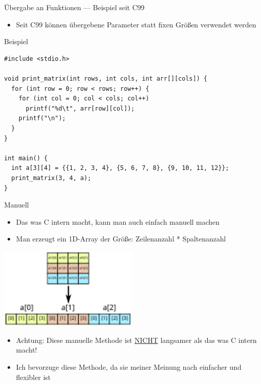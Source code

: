 \documentclass[presentation]{beamer}
\begin{document}
\begin{frame}[label={sec:orgc61af48},fragile]{Übergabe an Funktionen --- Beispiel seit C99}
 \begin{itemize}
\item Seit C99 können übergebene Parameter statt fixen Größen verwendet
werden
\end{itemize}
\begin{block}{Beispiel}
\begin{verbatim}
#include <stdio.h>

void print_matrix(int rows, int cols, int arr[][cols]) {
  for (int row = 0; row < rows; row++) {
    for (int col = 0; col < cols; col++)
      printf("%d\t", arr[row][col]);
    printf("\n");
  }
}

int main() {
  int a[3][4] = {{1, 2, 3, 4}, {5, 6, 7, 8}, {9, 10, 11, 12}};
  print_matrix(3, 4, a);
}
\end{verbatim}
\end{block}
\end{frame}

\begin{frame}[label={sec:org5f55b82}]{Manuell}
\begin{itemize}
\item Das was C intern macht, kann man auch einfach manuell machen
\item Man erzeugt ein 1D-Array der Größe: \alert{Zeilenanzahl * Spaltenanzahl}
\end{itemize}
\begin{center}\begin{center}
\includegraphics[width=0.5\textwidth]{2dto1d.pdf}
\end{center}\end{center} 
\begin{itemize}
\item \alert{Achtung: Diese manuelle Methode ist \uline{NICHT} langsamer als das was C intern macht!}
\item Ich bevorzuge diese Methode, da sie meiner Meinung nach \alert{einfacher
und flexibler} ist
\end{itemize}
\end{frame}
\end{document}
